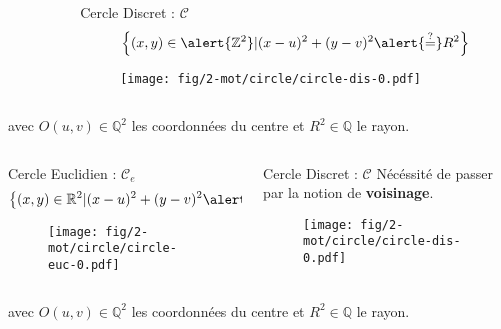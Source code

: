 \begin{frame}
{\begin{columns}[t]
\begin{column}{0.5\linewidth}
    \end{column}
    \begin{column}{0.5\linewidth}
      \begin{block}{Cercle Discret : $\mathcal{C}$}
        $$\left\{ (x,y) \in \alert{\mathbb{Z}^{2}} | (x - u)^2 + (y - v)^2 \alert{\stackrel{?}{=}} R^2 \right\}$$
        \vspace{-0.24cm}
        \begin{figure}[h!]
          \centering
          \texttt{[image: fig/2-mot/circle/circle-dis-0.pdf]}
        \end{figure}
      \end{block}  
    \end{column}
  \end{columns} 

  \begin{exampleblock}{}
  avec $O(u,v) \in \mathbb{Q}^{2}$ les coordonnées du centre et $R^2 \in \mathbb{Q}$ le rayon.\\
  \end{exampleblock}
}

{
  \begin{columns}[t]
    \begin{column}{0.5\linewidth}
      \begin{block}{Cercle Euclidien : $\mathcal{C}_e$}
        $$\left\{ (x,y) \in \mathbb{R}^{2} | (x - u)^2 + (y - v)^2 \alert{=} R^2 \right\}$$
        \begin{figure}[h!]
          \centering
          \texttt{[image: fig/2-mot/circle/circle-euc-0.pdf]}
        \end{figure}
      \end{block}
    
    \end{column}
    \begin{column}{0.5\linewidth}
      \begin{block}{Cercle Discret : $\mathcal{C}$}
        Nécéssité de passer par la notion de \textbf{voisinage}.
        \vspace{0.24cm}
        \begin{figure}[h!]
          \centering
          \texttt{[image: fig/2-mot/circle/circle-dis-0.pdf]}
        \end{figure}
      \end{block}  
    \end{column}
  \end{columns} 

  \begin{exampleblock}{}
  avec $O(u,v) \in \mathbb{Q}^{2}$ les coordonnées du centre et $R^2 \in \mathbb{Q}$ le rayon.\\
  \end{exampleblock}
}
  
\end{frame}



